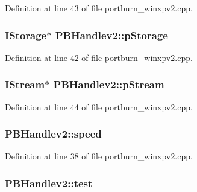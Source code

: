 Definition at line 43 of file portburn\+\_\+winxpv2.\+cpp.

\subsubsection[{\texorpdfstring{p\+Storage}{pStorage}}]{\setlength{\rightskip}{0pt plus 5cm}I\+Storage$\ast$ P\+B\+Handlev2\+::p\+Storage}\hypertarget{struct_p_b_handlev2_a1bc33e7d824c58e0bc75704185cafc03}{}\label{struct_p_b_handlev2_a1bc33e7d824c58e0bc75704185cafc03}


Definition at line 42 of file portburn\+\_\+winxpv2.\+cpp.

\subsubsection[{\texorpdfstring{p\+Stream}{pStream}}]{\setlength{\rightskip}{0pt plus 5cm}I\+Stream$\ast$ P\+B\+Handlev2\+::p\+Stream}\hypertarget{struct_p_b_handlev2_a80e201eb7673f6433f1cb8b028b509d8}{}\label{struct_p_b_handlev2_a80e201eb7673f6433f1cb8b028b509d8}


Definition at line 44 of file portburn\+\_\+winxpv2.\+cpp.

\subsubsection[{\texorpdfstring{speed}{speed}}]{ P\+B\+Handlev2\+::speed}\hypertarget{struct_p_b_handlev2_a68ec755f6c9c8bf0ae0ea3657ee495bd}{}\label{struct_p_b_handlev2_a68ec755f6c9c8bf0ae0ea3657ee495bd}


Definition at line 38 of file portburn\+\_\+winxpv2.\+cpp.

\subsubsection[{\texorpdfstring{test}{test}}]{ P\+B\+Handlev2\+::test}\hypertarget{struct_p_b_handlev2_a93cf1a1024cab315d0e18721f42ede35}{}\label{struct_p_b_handlev2_a93cf1a1024cab315d0e18721f42ede35}


